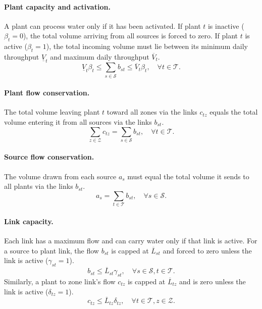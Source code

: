 \documentclass[10pt]{article}
\begin{document}
\paragraph{Plant capacity and activation.} A plant can process water only if it
has been activated. If plant $t$ is inactive ($\beta_t=0$), the total volume
arriving from all sources is forced to zero. If plant $t$ is active
($\beta_t=1$), the total incoming volume must lie between its minimum daily
throughput $\underline{V}_t$ and maximum daily throughput $\overline{V}_t$.
\begin{equation}\label{eq:plant_capacity}
    \underline{V}_t \beta_t
    \leq
    \sum_{s \in \mathcal{S}} b_{st}
    \leq
    \overline{V}_t \beta_t,
    \quad \forall t \in \mathcal{T}.
\end{equation}

\paragraph{Plant flow conservation.} The total volume leaving plant $t$ toward all zones via the links $c_{tz}$ equals the total volume entering it from all sources via the links $b_{st}$.
\begin{equation}
    \sum_{z \in \mathcal{Z}} c_{tz} = \sum_{s \in \mathcal{S}} b_{st},
    \quad \forall t \in \mathcal{T}.
\end{equation}

\paragraph{Source flow conservation.} The volume drawn from each source $a_{s}$ must equal the total volume it sends to all plants via the links $b_{st}$.
\begin{equation}
    a_s = \sum_{t \in \mathcal{T}} b_{st} , \quad \forall s \in \mathcal{S}.
\end{equation}

\paragraph{Link capacity.} Each link has a maximum flow and can carry water only if that link is active. For a source to plant link, the flow $b_{st}$ is capped at $\overline{L}_{st}$ and forced to zero unless the link is active ($\gamma_{st} = 1$).
\begin{equation}
    b_{st} \le \overline{L}_{st} \gamma_{st}, \quad \forall s \in \mathcal{S}, t \in \mathcal{T}.
\end{equation}
Similarly, a plant to zone link's flow $c_{tz}$ is capped at $\overline{L}_{tz}$ and is zero unless the link is active ($\delta_{tz} = 1$).
\begin{equation}
    c_{tz} \le \overline{L}_{tz} \delta_{tz}, \quad \forall t \in \mathcal{T}, z \in \mathcal{Z}.
\end{equation}
\end{document}
